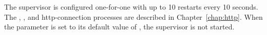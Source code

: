 The  supervisor is configured one-for-one with up to 10
restarts every 10 seconds. The ,
, and http-connection processes are described in
Chapter~\ref{chap:http}. When the  parameter is
set to its default value of , the  supervisor
is not started.
